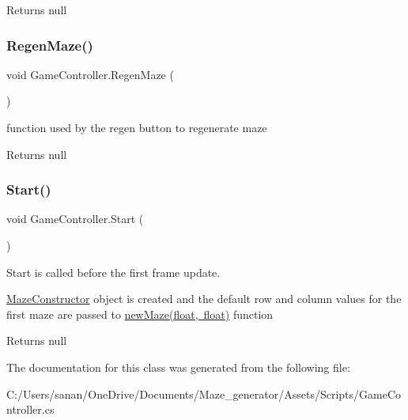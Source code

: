 \begin{DoxyReturn}{Returns}
null 
\end{DoxyReturn}
\mbox{\label{class_game_controller_ab371cbafba07091cb7b24e8338c14a1f}} 
\subsubsection{\texorpdfstring{RegenMaze()}{RegenMaze()}}
{\footnotesize\ttfamily void Game\+Controller.\+Regen\+Maze (\begin{DoxyParamCaption}{ }\end{DoxyParamCaption})}



function used by the regen button to regenerate maze 

\begin{DoxyReturn}{Returns}
null 
\end{DoxyReturn}
\mbox{\label{class_game_controller_a97788a7aa0f09c8d748781683e5f045b}} 
\subsubsection{\texorpdfstring{Start()}{Start()}}
{\footnotesize\ttfamily void Game\+Controller.\+Start (\begin{DoxyParamCaption}{ }\end{DoxyParamCaption})\hspace{0.3cm}{\ttfamily [private]}}



Start is called before the first frame update. 

\mbox{\hyperlink{class_maze_constructor}{Maze\+Constructor}} object is created and the default row and column values for the first maze are passed to \mbox{\hyperlink{class_game_controller_a1a65ce7d8077d3ee9fb43b59791181c2}{new\+Maze(float, float)}} function

\begin{DoxyReturn}{Returns}
null 
\end{DoxyReturn}


The documentation for this class was generated from the following file\+:\begin{DoxyCompactItemize}
\item 
C\+:/\+Users/sanan/\+One\+Drive/\+Documents/\+Maze\+\_\+generator/\+Assets/\+Scripts/Game\+Controller.\+cs\end{DoxyCompactItemize}
